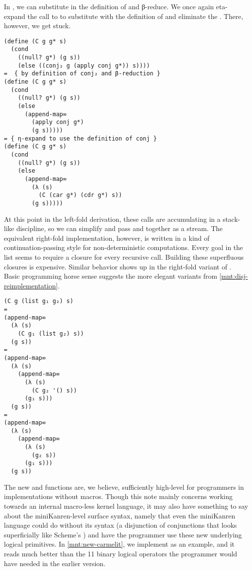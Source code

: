 \documentclass[sigplan,balance=true,pbalance=true,natbib=false]{acmart}
\begin{document}
In , we can substitute in the definition of
 and β-reduce. We once again eta-expand the call to
 to substitute with the definition of
 and eliminate the . There,
however, we get stuck.

\begin{verbatim}
(define (C g g* s)
  (cond
    ((null? g*) (g s))
    (else ((conj₂ g (apply conj g*)) s))))
=  { by definition of conj₂ and β-reduction }
(define (C g g* s)
  (cond
    ((null? g*) (g s))
    (else
      (append-map∞
        (apply conj g*)
        (g s)))))
= { η-expand to use the definition of conj }
(define (C g g* s)
  (cond
    ((null? g*) (g s))
    (else
      (append-map∞
        (λ (s)
          (C (car g*) (cdr g*) s))
        (g s)))))
\end{verbatim}

At this point in the left-fold derivation, these calls are
accumulating in a stack-like discipline, so we can simplify and pass
 and  together as a stream. The equivalent
right-fold implementation, however, is written in a kind of
continuation-passing style for non-deterministic computations. Every
goal in the list seems to require a closure for every recursive call.
Building these superfluous closures is expensive. Similar behavior
shows up in the right-fold variant of . Basic
programming horse sense suggests the more elegant variants from
\cref{mnt:disj-reimplementation}.

\begin{verbatim}
(C g (list g₁ g₂) s)
=
(append-map∞
  (λ (s)
    (C g₁ (list g₂) s))
  (g s))
=
(append-map∞
  (λ (s)
    (append-map∞
      (λ (s)
        (C g₂ '() s))
      (g₁ s)))
  (g s))
=
(append-map∞
  (λ (s)
    (append-map∞
      (λ (s)
        (g₂ s))
      (g₁ s)))
  (g s))
\end{verbatim}

The new  and  functions are, we
believe, sufficiently high-level for programmers in implementations
without macros. Though this note mainly concerns working towards an
internal macro-less kernel language, it may also have something to say
about the miniKanren-level surface syntax, namely that even the
miniKanren language could do without its  syntax (a
disjunction of conjunctions that looks superficially like
Scheme's ) and have the programmer use these new
underlying logical primitives. In \cref{mnt:new-carmelit}, we
implement  as an example, and it reads
much better than the 11 binary logical operators the programmer would
have needed in the earlier version.
\end{document}
